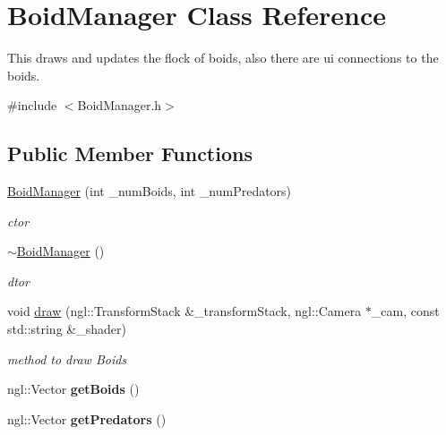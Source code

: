 \hypertarget{classBoidManager}{
\section{BoidManager Class Reference}
\label{classBoidManager}
}


This draws and updates the flock of boids, also there are ui connections to the boids.  




{\ttfamily \#include $<$BoidManager.h$>$}

\subsection*{Public Member Functions}
\begin{DoxyCompactItemize}
\item 
\hyperlink{classBoidManager_a1cea425dbe15e5c69f572b4f9e9ff1b3}{BoidManager} (int \_\-numBoids, int \_\-numPredators)
\begin{DoxyCompactList}\small\item\em ctor \end{DoxyCompactList}\item 
\hypertarget{classBoidManager_acad25c7d13af5267a02e1073ff49ed09}{
\hyperlink{classBoidManager_acad25c7d13af5267a02e1073ff49ed09}{$\sim$BoidManager} ()}
\label{classBoidManager_acad25c7d13af5267a02e1073ff49ed09}

\begin{DoxyCompactList}\small\item\em dtor \end{DoxyCompactList}\item 
void \hyperlink{classBoidManager_a65897340e3e3d548ddac409dca8d94be}{draw} (ngl::TransformStack \&\_\-transformStack, ngl::Camera $\ast$\_\-cam, const std::string \&\_\-shader)
\begin{DoxyCompactList}\small\item\em method to draw Boids \end{DoxyCompactList}\item 
\hypertarget{classBoidManager_a18c66a4558bcb6e23fc3f0bc188ee39c}{
ngl::Vector {\bfseries getBoids} ()}
\label{classBoidManager_a18c66a4558bcb6e23fc3f0bc188ee39c}

\item 
\hypertarget{classBoidManager_a7b19899511f7fa9a721d0f6700b9492b}{
ngl::Vector {\bfseries getPredators} ()}
\label{classBoidManager_a7b19899511f7fa9a721d0f6700b9492b}


\end{DoxyCompactItemize}
